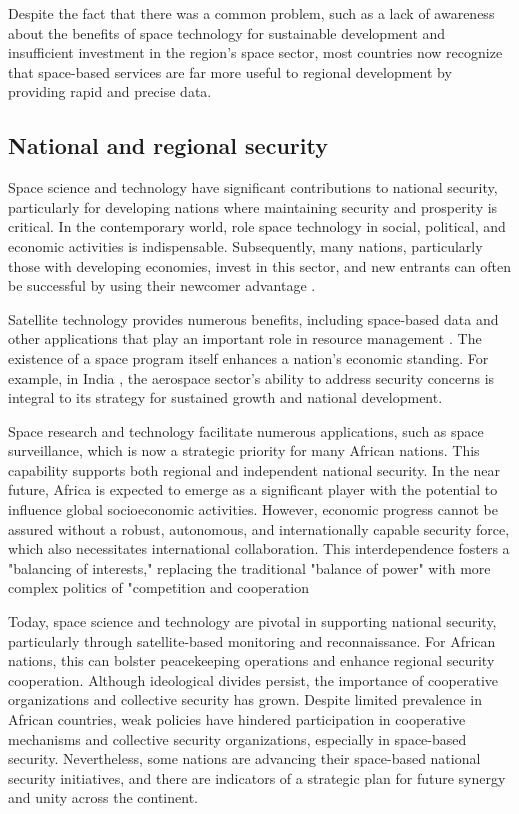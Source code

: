\documentclass[final,5p,times, twocolumn, sort&compress, sc]{elsarticle}
\begin{document}
Despite the fact that there was a common problem, such as a lack of awareness about the benefits of space technology for sustainable development and insufficient investment in the region's space sector, most countries now recognize that space-based services are far more useful to regional development by providing rapid and precise data. 

\subsection{\textbf{National and regional security}}
Space science and technology have significant contributions to national security, particularly for developing nations where maintaining security and prosperity is critical. In the contemporary world, role space technology in social, political, and economic activities is indispensable. Subsequently, many nations, particularly those with developing economies, invest in this sector, and new entrants can often be successful by using their newcomer advantage \cite{ehlers2016air}. 

Satellite technology provides numerous benefits, including space-based data and other applications that play an important role in resource management \cite{metzger2016space}. The existence of a space program itself enhances a nation's economic standing. For example, in India \cite{nair2006space}, the aerospace sector's ability to address security concerns is integral to its strategy for sustained growth and national development.

Space research and technology facilitate numerous applications, such as space surveillance, which is now a strategic priority for many African nations. This capability supports both regional and independent national security. In the near future, Africa is expected to emerge as a significant player with the potential to influence global socioeconomic activities. However, economic progress cannot be assured without a robust, autonomous, and internationally capable security force, which also necessitates international collaboration. This interdependence fosters a "balancing of interests," replacing the traditional "balance of power" with more complex politics of "competition and cooperation \cite{bediaerospace} 

Today, space science and technology are pivotal in supporting national security, particularly through satellite-based monitoring and reconnaissance. For African nations, this can bolster peacekeeping operations and enhance regional security cooperation. Although ideological divides persist, the importance of cooperative organizations and collective security has grown. Despite limited prevalence in African countries, weak policies have hindered participation in cooperative mechanisms and collective security organizations, especially in space-based security. Nevertheless, some nations are advancing their space-based national security initiatives, and there are indicators of a strategic plan for future synergy and unity across the continent.
\end{document}
